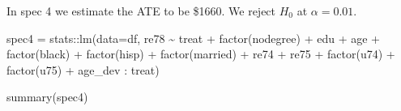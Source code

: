 \documentclass[
]{article}
\newenvironment{Shaded}{\begin{snugshade}}{\end{snugshade}}
\newcommand{\AttributeTok}[1]{\textcolor[rgb]{0.77,0.63,0.00}{#1}}
\newcommand{\FunctionTok}[1]{\textcolor[rgb]{0.00,0.00,0.00}{#1}}
\newcommand{\NormalTok}[1]{#1}
\newcommand{\OtherTok}[1]{\textcolor[rgb]{0.56,0.35,0.01}{#1}}
\newcommand{\SpecialCharTok}[1]{\textcolor[rgb]{0.00,0.00,0.00}{#1}}
\begin{document}
In spec 4 we estimate the ATE to be \$1660. We reject \(H_0\) at
\(\alpha = 0.01\).

\begin{Shaded}
\end{Shaded}

\begin{Shaded}
\begin{Highlighting}[]
\NormalTok{spec4 }\OtherTok{=}\NormalTok{ stats}\SpecialCharTok{::}\FunctionTok{lm}\NormalTok{(}\AttributeTok{data=}\NormalTok{df, re78 }\SpecialCharTok{\textasciitilde{}}\NormalTok{ treat }\SpecialCharTok{+} \FunctionTok{factor}\NormalTok{(nodegree) }\SpecialCharTok{+}\NormalTok{ edu }\SpecialCharTok{+}\NormalTok{ age }\SpecialCharTok{+} \FunctionTok{factor}\NormalTok{(black) }\SpecialCharTok{+} \FunctionTok{factor}\NormalTok{(hisp) }\SpecialCharTok{+} \FunctionTok{factor}\NormalTok{(married) }\SpecialCharTok{+}\NormalTok{ re74 }\SpecialCharTok{+}\NormalTok{ re75 }\SpecialCharTok{+} \FunctionTok{factor}\NormalTok{(u74) }\SpecialCharTok{+} \FunctionTok{factor}\NormalTok{(u75) }\SpecialCharTok{+}\NormalTok{ age\_dev }\SpecialCharTok{:}\NormalTok{ treat)}

\FunctionTok{summary}\NormalTok{(spec4)}
\end{Highlighting}
\end{Shaded}
\end{document}
